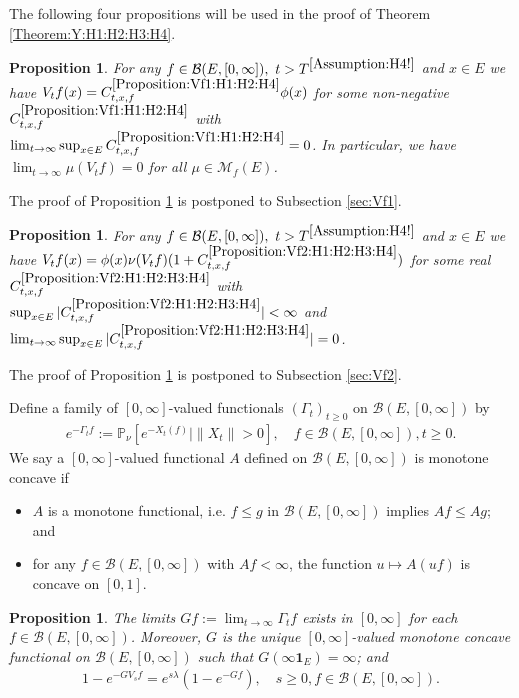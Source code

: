 \documentclass[12pt,a4paper]{amsart}
\numberwithin{equation}{section}
\theoremstyle{plain}
\newtheorem{prop}[thm]{Proposition}
\theoremstyle{definition}
\theoremstyle{remark}
\newcounter{N}
\newcounter{n}[N]
\begin{document}
	The following four propositions will be used in the proof of Theorem \ref{Theorem:Y:H1:H2:H3:H4}.

\begin{prop} \label{Proposition:Vf1:H1:H2:H4} 
	For any $f\in \mathcal B(E, [0,\infty]),~t > T^{\ref{Assumption:H4!}}$ and $x\in E$ we have $V_tf(x) = C^{\ref{Proposition:Vf1:H1:H2:H4}}_{t,x,f} \phi(x)$ for some non-negative $C_{t,x,f}^{\ref{Proposition:Vf1:H1:H2:H4}}$ with $ \lim_{t\to \infty} \sup_{x\in E} C^{\ref{Proposition:Vf1:H1:H2:H4}}_{t,x,f} = 0$.
	In particular, we have $\lim_{t\to \infty} \mu(V_tf)= 0 $ for all $\mu \in \mathcal M_f(E)$.
\end{prop} 

The proof of Proposition \ref{Proposition:Vf1:H1:H2:H4} is postponed to Subsection \ref{sec:Vf1}. 

\begin{prop} \label{Proposition:Vf2:H1:H2:H3:H4} 
	For any $f\in \mathcal B(E,[0,\infty]),~t>T^{\ref{Assumption:H4!}}$ and $x\in E$ we have $V_tf(x) = \phi(x) \nu (V_tf) (1+C^{\ref{Proposition:Vf2:H1:H2:H3:H4}}_{t,x,f}) $ for some real $C^{\ref{Proposition:Vf2:H1:H2:H3:H4}}_{t,x,f}$ with $\sup_{x\in E} |C^{\ref{Proposition:Vf2:H1:H2:H3:H4}}_{t,x,f}| < \infty$ and $\lim_{t\to \infty} \sup_{x\in E} |C^{\ref{Proposition:Vf2:H1:H2:H3:H4}}_{t,x,f}| = 0$.
\end{prop}

	The proof of Proposition \ref{Proposition:Vf2:H1:H2:H3:H4} is postponed to Subsection \ref{sec:Vf2}.

Define a family of $[0,\infty]$-valued functionals $(\Gamma_t)_{t\geq 0}$ on $\mathcal B(E,[0,\infty])$ by 
\begin{align}
 e^{-\Gamma_t f} 
:= \mathbb P_{\nu}[e^{- X_t(f)}| \|X_t\| > 0], 
 \quad f\in \mathcal B(E,[0,\infty]), t \geq 0.
 \end{align}
We say a $[0,\infty]$-valued functional $A$ defined on $\mathcal B(E,[0,\infty])$ is monotone concave if
\begin{itemize}
\item
$A$ is a monotone functional, i.e. $f\leq g$ in $\mathcal B(E,[0,\infty])$ implies $Af \leq Ag$; and
\item
for any $f\in \mathcal B(E,[0,\infty])$ with $Af< \infty$, the function $u \mapsto A(uf)$ is concave on $[0,1]$.
\end{itemize}
\begin{prop} \label{Proposition:G:H1:H2:H3:H4} 
The limits $Gf:= \lim_{t\to \infty} \Gamma_t f$ exists in $[0,\infty]$ for each $f\in \mathcal B(E,[0,\infty])$. 
Moreover, $G$ is the unique $[0,\infty]$-valued monotone concave functional on $\mathcal B(E,[0,\infty])$ such that $G(\infty \mathbf 1_E) = \infty$; and
\begin{align} 
\label{eq:G.0}
1 - e^{- GV_s f} 
= e^{s\lambda} (1 - e^{-Gf}), 
\quad s\geq 0, f\in \mathcal B(E,[0,\infty]).
\end{align}
\end{prop} 
\end{document}

